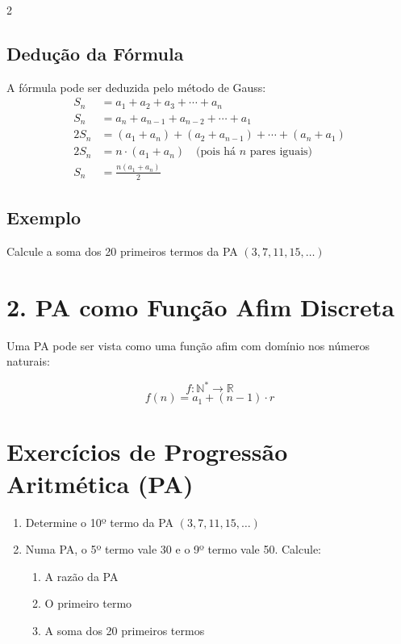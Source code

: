 \documentclass[11pt]{article}
\begin{document}
\begin{multicols}{2}
\subsection*{Dedução da Fórmula}

A fórmula pode ser deduzida pelo método de Gauss:
\begin{align*}
S_n &= a_1 + a_2 + a_3 + \cdots + a_n \\
S_n &= a_n + a_{n-1} + a_{n-2} + \cdots + a_1 \\
\hline
2S_n &= (a_1+a_n) + (a_2+a_{n-1}) + \cdots + (a_n+a_1) \\
2S_n &= n \cdot (a_1 + a_n) \quad \text{(pois há $n$ pares iguais)} \\
S_n &= \frac{n(a_1 + a_n)}{2}
\end{align*}

\subsection*{Exemplo}

Calcule a soma dos 20 primeiros termos da PA $(3, 7, 11, 15, \ldots)$

\section*{2. PA como Função Afim Discreta}
Uma PA pode ser vista como uma função afim com domínio nos números naturais:

\[
f: \mathbb{N}^* \rightarrow \mathbb{R}
\]
\[
f(n) = a_1 + (n-1) \cdot r
\]

\section*{Exercícios de Progressão Aritmética (PA)}

\begin{enumerate}[leftmargin=*]

\item Determine o 10º termo da PA $(3, 7, 11, 15, \ldots)$

\item Numa PA, o 5º termo vale 30 e o 9º termo vale 50. Calcule:
\begin{enumerate}[label=\alph*)]
\item A razão da PA
\item O primeiro termo
\item A soma dos 20 primeiros termos
\end{enumerate}


\end{enumerate}
\end{multicols}
\end{document}
